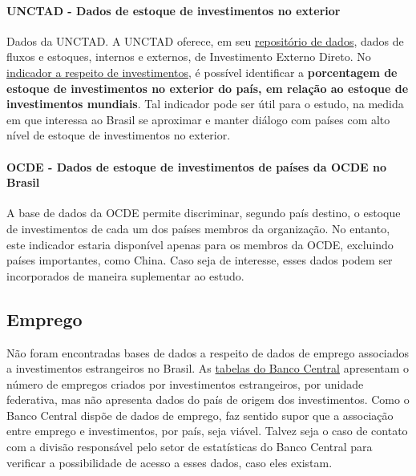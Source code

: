 \documentclass[
]{article}
\begin{document}
\hypertarget{unctad---dados-de-estoque-de-investimentos-no-exterior}{%
\paragraph{UNCTAD - Dados de estoque de investimentos no
exterior}\label{unctad---dados-de-estoque-de-investimentos-no-exterior}}

Dados da UNCTAD. A UNCTAD oferece, em seu
\href{https://unctadstat.unctad.org/en/BulkDownload.html}{repositório de
dados}, dados de fluxos e estoques, internos e externos, de Investimento
Externo Direto. No
\href{https://unctadstat.unctad.org/7zip/US_FdiFlowsStock.csv.7z}{indicador
a respeito de investimentos}, é possível identificar a
\textbf{porcentagem de estoque de investimentos no exterior do país, em
relação ao estoque de investimentos mundiais}. Tal indicador pode ser
útil para o estudo, na medida em que interessa ao Brasil se aproximar e
manter diálogo com países com alto nível de estoque de investimentos no
exterior.

\hypertarget{ocde---dados-de-estoque-de-investimentos-de-pauxedses-da-ocde-no-brasil}{%
\paragraph{OCDE - Dados de estoque de investimentos de países da OCDE no
Brasil}\label{ocde---dados-de-estoque-de-investimentos-de-pauxedses-da-ocde-no-brasil}}

A base de dados da OCDE permite discriminar, segundo país destino, o
estoque de investimentos de cada um dos países membros da organização.
No entanto, este indicador estaria disponível apenas para os membros da
OCDE, excluindo países importantes, como China. Caso seja de interesse,
esses dados podem ser incorporados de maneira suplementar ao estudo.

\hypertarget{emprego}{%
\subsection{Emprego}\label{emprego}}

Não foram encontradas bases de dados a respeito de dados de emprego
associados a investimentos estrangeiros no Brasil. As
\href{https://www.bcb.gov.br/content/estatisticas/Documents/Tabelas_especiais/TabelasCompletasPosicaoIDP.xlsx}{tabelas
do Banco Central} apresentam o número de empregos criados por
investimentos estrangeiros, por unidade federativa, mas não apresenta
dados do país de origem dos investimentos. Como o Banco Central dispõe
de dados de emprego, faz sentido supor que a associação entre emprego e
investimentos, por país, seja viável. Talvez seja o caso de contato com
a divisão responsável pelo setor de estatísticas do Banco Central para
verificar a possibilidade de acesso a esses dados, caso eles existam.
\end{document}
